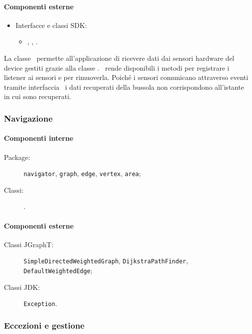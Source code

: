 \documentclass[../Funzionalita.tex]{subfiles}
\begin{document}
			
			\paragraph*{Componenti esterne}
			\begin{itemize}
			
				\item Interfacce e classi SDK:
				\begin{itemize}
					\item[] \SensorManager, \Sensor, \SensorEventListener.
				\end{itemize}
				
			\end{itemize}
			
			La classe \Compass\ permette all'applicazione di ricevere dati dai sensori hardware del device gestiti grazie alla classe \Sensor. \Compass\ rende disponibili i metodi per registrare i listener ai sensori e per rimuoverla. Poiché i sensori comunicano attraverso eventi tramite interfaccia \SensorEventListener\ i dati recuperati della bussola non corrispondono all'istante in cui sono recuperati.
			
		
		\subsubsection{Navigazione}
		
			\paragraph*{Componenti interne}
			\begin{description}
				\item[Package:] \verb|navigator|, \verb|graph|, \verb|edge|, \verb|vertex|, \verb|area|;
				\item[Classi:] \verb||.
			\end{description}
			
			\paragraph*{Componenti esterne}
			\begin{description}
				\item[Classi JGraphT:] \verb|SimpleDirectedWeightedGraph|, \verb|DijkstraPathFinder|, \verb|DefaultWeightedEdge|;
				\item[Classi JDK:] \verb|Exception|.
			\end{description}
			
		\subsubsection{Eccezioni e gestione}
\end{document}
